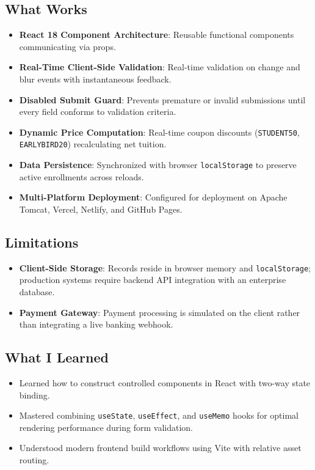 \documentclass[11pt,a4paper]{article}
\begin{document}
\subsection{What Works}
\begin{itemize}
    \item \textbf{React 18 Component Architecture}: Reusable functional components communicating via props.
    \item \textbf{Real-Time Client-Side Validation}: Real-time validation on change and blur events with instantaneous feedback.
    \item \textbf{Disabled Submit Guard}: Prevents premature or invalid submissions until every field conforms to validation criteria.
    \item \textbf{Dynamic Price Computation}: Real-time coupon discounts (\texttt{STUDENT50}, \texttt{EARLYBIRD20}) recalculating net tuition.
    \item \textbf{Data Persistence}: Synchronized with browser \texttt{localStorage} to preserve active enrollments across reloads.
    \item \textbf{Multi-Platform Deployment}: Configured for deployment on Apache Tomcat, Vercel, Netlify, and GitHub Pages.
\end{itemize}

\subsection{Limitations}
\begin{itemize}
    \item \textbf{Client-Side Storage}: Records reside in browser memory and \texttt{localStorage}; production systems require backend API integration with an enterprise database.
    \item \textbf{Payment Gateway}: Payment processing is simulated on the client rather than integrating a live banking webhook.
\end{itemize}

\subsection{What I Learned}
\begin{itemize}
    \item Learned how to construct controlled components in React with two-way state binding.
    \item Mastered combining \texttt{useState}, \texttt{useEffect}, and \texttt{useMemo} hooks for optimal rendering performance during form validation.
    \item Understood modern frontend build workflows using Vite with relative asset routing.
\end{itemize}
\end{document}
